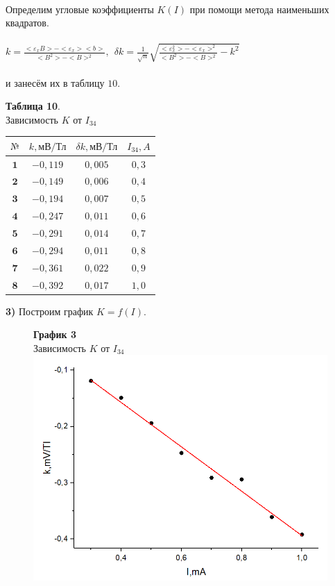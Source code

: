 \documentclass[11pt,a4paper]{article}
\begin{document}
\\
Определим угловые коэффициенты $K(I)$ при помощи метода наименьших квадратов.
\\\\
$k = \frac {<\varepsilon_x B> - <\varepsilon_x><b>}{<B^2>-<B>^2}, \ \ \delta k = \frac{1}{\sqrt{n}} \sqrt{\frac{<\varepsilon_x^2>-<\varepsilon_x>^2}{<B^2>-<B>^2} - k^2}$
\\\\
и занесём их в таблицу $10$.
\newpage
\begin{table}[h!] 
	\begin{center} 
		\textbf{Таблица 10}. \\ Зависимость $K$ от $I_{34}$\\
		\begin{tabular}{|c|c|c|c|} 
			\hline 
			$\text{№}$ & $k,\text{мВ/Тл}$ & $\delta k,\text{мВ/Тл}$ & $I_{34},A$ \\ \hline 
			$\textbf{1}$ & $-0,119$ & $0,005$ & $0,3$ \\ \hline
			$\textbf{2}$ & $-0,149$ & $0,006$ & $0,4$ \\ \hline
			$\textbf{3}$ & $-0,194$ & $0,007$ & $0,5$ \\ \hline
			$\textbf{4}$ & $-0,247$ & $0,011$ & $0,6$ \\ \hline
			$\textbf{5}$ & $-0,291$ & $0,014$ & $0,7$ \\ \hline
			$\textbf{6}$ & $-0,294$ & $0,011$ & $0,8$ \\ \hline
			$\textbf{7}$ & $-0,361$ & $0,022$ & $0,9$ \\ \hline
			$\textbf{8}$ & $-0,392$ & $0,017$ & $1,0$ \\ \hline
		\end{tabular} 
	\end{center} 
\end{table}
\textbf{3)} Построим график $K=f(I)$.\\
\begin{figure}[h!]
	\centering
	\textbf {График 3} \\
	Зависимость $K$ от $I_{34}$\\
	\includegraphics[width=0.7\linewidth]{4}
\end{figure}
\end{document}
